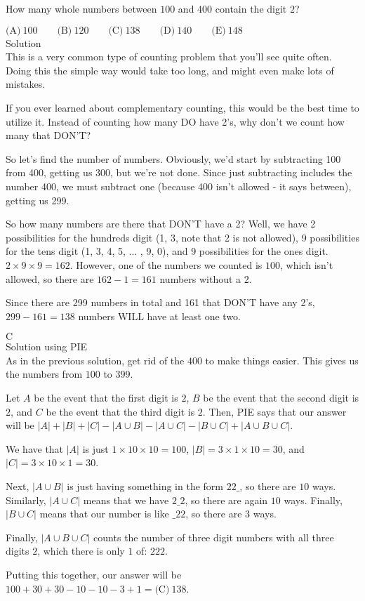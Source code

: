 

How many whole numbers between $100$ and $400$ contain the digit $2$?

$\text{(A)}\ 100 \qquad \text{(B)}\ 120 \qquad \text{(C)}\ 138 \qquad \text{(D)}\ 140 \qquad \text{(E)}\ 148$
\\
Solution
\\
This is a very common type of counting problem that you'll see quite often. Doing this the simple way would take too long, and might even make lots of mistakes.

If you ever learned about complementary counting, this would be the best time to utilize it. Instead of counting how many DO have 2's, why don't we count how many that DON'T?

So let's find the number of numbers. Obviously, we'd start by subtracting 100 from 400, getting us 300, but we're not done. Since just subtracting includes the number 400, we must subtract one (because 400 isn't allowed - it says between), getting us 299.

So how many numbers are there that DON'T have a 2? Well, we have 2 possibilities for the hundreds digit (1, 3, note that 2 is not allowed), 9 possibilities for the tens digit (1, 3, 4, 5, ... , 9, 0), and 9 possibilities for the ones digit. $2 \times 9 \times 9 = 162$. However, one of the numbers we counted is $100$, which isn't allowed, so there are $162-1=161$ numbers without a 2.

Since there are 299 numbers in total and 161 that DON'T have any 2's, $299 - 161 = 138$ numbers WILL have at least one two.

$\boxed{\text{C}}$
\\
Solution using PIE
\\
As in the previous solution, get rid of the $400$ to make things easier. This gives us the numbers from $100$ to $399$.

Let $A$ be the event that the first digit is $2$, $B$ be the event that the second digit is $2$, and $C$ be the event that the third digit is $2$. Then, PIE says that our answer will be $|A|+|B|+|C|-|A\cup B|-|A\cup C|-|B\cup C|+|A\cup B\cup C|$.

We have that $|A|$ is just $1\times10\times10=100$, $|B|=3\times1\times10=30$, and $|C|=3\times10\times1=30$.

Next, $|A\cup B|$ is just having something in the form $22\_$, so there are $10$ ways. Similarly, $|A\cup C|$ means that we have $2\_2$, so there are again $10$ ways. Finally, $|B\cup C|$ means that our number is like $\_22$, so there are $3$ ways.

Finally, $|A\cup B\cup C|$ counts the number of three digit numbers with all three digits $2$, which there is only $1$ of: $222$.

Putting this together, our answer will be $100+30+30-10-10-3+1=\boxed{\text{(C)}\ 138}$.
